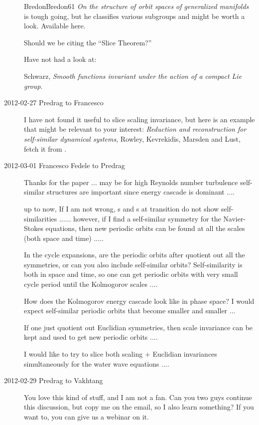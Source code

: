 \begin{description}
Bredon{Bredon61} \emph{On the structure of orbit spaces of generalized
manifolds} is tough going, but he classifies various subgroups and might
be worth a look. Available
{here}.


Should we be citing the ``Slice Theorem?''

Have not had a look at:

Schwarz,
\emph{Smooth functions invariant under the action of a compact {Lie} group}.

\item[2012-02-27 Predrag to Francesco]
I have not found it useful to slice scaling invariance, but here is an
example that might be relevant to your interest: \emph{Reduction and
reconstruction for self-similar dynamical systems}, Rowley, Kevrekidis,
Marsden and Lust, fetch it from
.

\item[2012-03-01 Francesco Fedele to Predrag]

Thanks for the paper ... may be for high Reynolds number turbulence
self-similar structures are important since energy cascade is dominant
....

up to now, If I am not wrong, \rpo s and \po s at transition
do not show self-similarities ...... however, if I find a
self-similar symmetry for the Navier-Stokes equations, then new
periodic orbits can be found at all the scales (both space and time)
.....

In the cycle expansions, are the periodic orbits after quotient out
all the symmetries, or can you also include self-similar orbits?
Self-similarity is both in space and time, so one can get periodic
orbits with very small cycle period until the Kolmogorov scales ....

How does the Kolmogorov energy cascade look like in phase space?  I
would expect self-similar periodic orbits that become smaller and
smaller ...

If one just quotient out Euclidian symmetries, then scale invariance
can be kept and used to get new periodic orbits ....

I would like to try to slice both scaling + Euclidian invariances
simultaneously for the water wave equations ....

\item[2012-02-29 Predrag to Vakhtang] You love this kind of stuff, and I
am not a fan. Can you two guys continue this discussion, but copy me on
the email, so I also learn something? If you want to, you can give us a
webinar on it.


\end{description}
